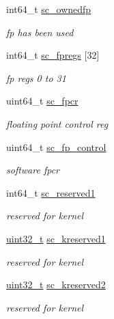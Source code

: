 \begin{DoxyCompactItemize}
int64\_\-t \hyperlink{structTru64_1_1sigcontext_a732c560c7a713e0b257de41bf7b87492}{sc\_\-ownedfp}
\begin{DoxyCompactList}\small\item\em fp has been used \item\end{DoxyCompactList}\item 
int64\_\-t \hyperlink{structTru64_1_1sigcontext_a2ea5188bbda21c51b675a6ae858f26f2}{sc\_\-fpregs} \mbox{[}32\mbox{]}
\begin{DoxyCompactList}\small\item\em fp regs 0 to 31 \item\end{DoxyCompactList}\item 
uint64\_\-t \hyperlink{structTru64_1_1sigcontext_a8a56b1140ffe46bd98dc46d1b3d0f9e8}{sc\_\-fpcr}
\begin{DoxyCompactList}\small\item\em floating point control reg \item\end{DoxyCompactList}\item 
uint64\_\-t \hyperlink{structTru64_1_1sigcontext_a7424e3c8190d07388ff2556b9bbdead7}{sc\_\-fp\_\-control}
\begin{DoxyCompactList}\small\item\em software fpcr \item\end{DoxyCompactList}\item 
int64\_\-t \hyperlink{structTru64_1_1sigcontext_a0837bcfc191b292323ea5f4d78dd770d}{sc\_\-reserved1}
\begin{DoxyCompactList}\small\item\em reserved for kernel \item\end{DoxyCompactList}\item 
\hyperlink{Type_8hh_a435d1572bf3f880d55459d9805097f62}{uint32\_\-t} \hyperlink{structTru64_1_1sigcontext_ae6ae97be9e30fac27f56a51e627154a7}{sc\_\-kreserved1}
\begin{DoxyCompactList}\small\item\em reserved for kernel \item\end{DoxyCompactList}\item 
\hyperlink{Type_8hh_a435d1572bf3f880d55459d9805097f62}{uint32\_\-t} \hyperlink{structTru64_1_1sigcontext_a9eda181ddd4232c393460580a3b1ba90}{sc\_\-kreserved2}
\begin{DoxyCompactList}\small\item\em reserved for kernel \item\end{DoxyCompactList}\item 

\end{DoxyCompactItemize}
